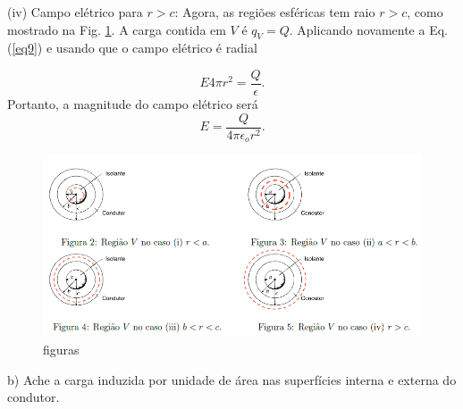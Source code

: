 \begin{enumerate}[start=1,label={\bfseries Q\arabic*.}]
(iv) Campo elétrico para $r > c$: Agora, as regiões esféricas tem raio $r > c$, como mostrado na Fig. \ref{figuraspng}. A carga contida em $V$ é $q_{V} = Q$. Aplicando novamente a Eq. (\ref{eq9}) e usando que o campo elétrico é radial

%
\begin{equation}
  E 4 \pi r^{2} = \frac{Q}{\epsilon} .
\end{equation}
%
Portanto, a magnitude do campo elétrico será
%
\begin{equation}
  E = \frac{Q}{4\pi \epsilon_{o} r^{2}} .
\end{equation}

\begin{figure}[H]
  \centering
  \includegraphics[scale=1]{eletromag-img/imagens.png}
  \caption{figuras}\label{figuraspng}
\end{figure}

b) Ache a carga induzida por unidade de área nas superfícies interna e externa do condutor.


\end{enumerate}
